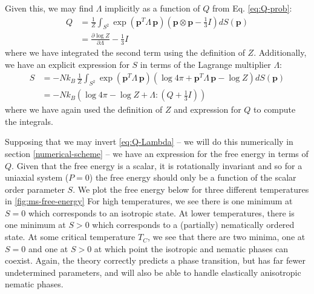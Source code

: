 \documentclass[reqno]{article}
\begin{document}
  Given this, we may find $\Lambda$ implicitly as a function of $Q$ from Eq.
  \eqref{eq:Q-prob}:
  \begin{equation} \label{eq:Q-Lambda}
    \begin{split}
      Q
      &=
      \frac{1}{Z} \int_{S^2} \exp(\mathbf{p}^T \Lambda \, \mathbf{p}) \left( \mathbf{p} \otimes \mathbf{p} - \tfrac13 I \right) dS(\mathbf{p}) \\
      &=
      \frac{\partial \log Z}{\partial \Lambda} - \frac13 I
    \end{split}
  \end{equation}
  where we have integrated the second term using the definition of $Z$.
  Additionally, we have an explicit expression for $S$ in terms
  of the Lagrange multiplier $\Lambda$:
  \begin{equation}
    \begin{split}
      S
      &=
      -N k_B \,
      \frac{1}{Z}
      \int_{S^2}
      \exp(\mathbf{p}^T \Lambda \, \mathbf{p}) \left( \log 4 \pi + \mathbf{p}^T \Lambda \, \mathbf{p} - \log Z \right) dS(\mathbf{p}) \\
      &=
      -N k_B \left(
        \log 4 \pi - \log Z + \Lambda : \left( Q + \tfrac13 I \right)
      \right)
    \end{split}
  \end{equation}
  where we have again used the definition of $Z$ and expression for $Q$ to
  compute the integrals.

  Supposing that we may invert \eqref{eq:Q-Lambda} -- we will do this
  numerically in section \ref{numerical-scheme} -- we have an expression for the
  free energy in terms of $Q$.
  Given that the free energy is a scalar, it is rotationally invariant and so
  for a uniaxial system ($P = 0$) the free energy should only be a function of
  the scalar order parameter $S$.
  We plot the free energy below for three different temperatures in \ref{fig:ms-free-energy}
  For high temperatures, we see there is one minimum at $S = 0$ which
  corresponds to an isotropic state.
  At lower temperatures, there is one minimum at $S > 0$ which corresponds to a
  (partially) nematically ordered state.
  At some critical temperature $T_C$, we see that there are two minima, one at
  $S = 0$ and one at $S > 0$ at which point the isotropic and nematic phases can
  coexist.
  Again, the theory correctly predicts a phase transition, but has far fewer
  undetermined parameters, and will also be able to handle elastically
  anisotropic nematic phases.
\end{document}

